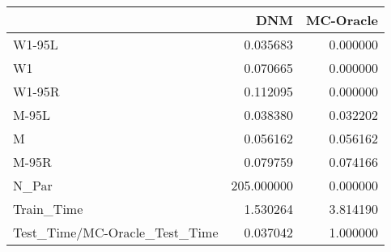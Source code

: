 \begin{tabular}{lrr}
\toprule
{} &         DNM &  MC-Oracle \\
\midrule
W1-95L                        &    0.035683 &   0.000000 \\
W1                            &    0.070665 &   0.000000 \\
W1-95R                        &    0.112095 &   0.000000 \\
M-95L                         &    0.038380 &   0.032202 \\
M                             &    0.056162 &   0.056162 \\
M-95R                         &    0.079759 &   0.074166 \\
N\_Par                         &  205.000000 &   0.000000 \\
Train\_Time                    &    1.530264 &   3.814190 \\
Test\_Time/MC-Oracle\_Test\_Time &    0.037042 &   1.000000 \\
\bottomrule
\end{tabular}
